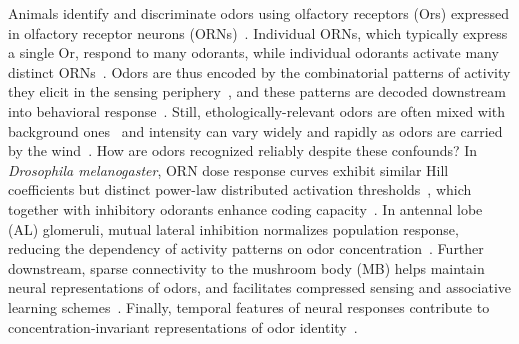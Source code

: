 \documentclass[9pt,lineno]{elife}
\begin{document}
Animals identify and discriminate odors using olfactory receptors (Ors) expressed in olfactory receptor neurons (ORNs)~\citep{chemoreceptors_review,buck1991novel,or_discovery_carlson,or_discovery_vosshall}. Individual ORNs, which typically express a single Or, respond to many odorants, while individual odorants activate many distinct ORNs~\citep{friedrich1997combinatorial,hallem_carlson,mosquito_combinatorial_coding,nara2011large}. Odors are  thus encoded by the combinatorial patterns of activity they elicit in the sensing periphery~\citep{malnic1999combinatorial, mosquito_combinatorial_coding, hildebrand1997mechanisms, hallem_carlson, debryune_odor_coding, friedrich1997combinatorial}, and these patterns are decoded downstream into behavioral response~\citep{early_olfactory_processing, louis_chemotaxis}.  Still, ethologically-relevant odors are often mixed with background ones~\citep{coding_background, odor_backgrounds} and intensity can vary widely and rapidly as odors are carried by the wind~\citep{murlis_odor_plumes, fluid_dynamics_chemosensory, celani, carde_navigation}. How are odors recognized reliably despite these confounds? %
In \textit{Drosophila melanogaster}, ORN dose response curves exhibit similar Hill coefficients but distinct power-law distributed activation thresholds~\citep{hallem_carlson, si2017invariances}, which together with inhibitory odorants enhance coding capacity~\citep{si2017invariances, Cao_Tu_WL, hallem_carlson, stevens}. In antennal lobe (AL) glomeruli, mutual lateral inhibition normalizes population response, reducing the dependency of activity patterns on odor concentration~\citep{lateral_inh_asahina, divisive_normalization}. Further downstream, sparse connectivity to the mushroom body (MB) helps maintain neural representations of odors, and facilitates compressed sensing and associative learning schemes~\citep{abbott_axel, litwinkumar, vijay_1, stevens_2}. Finally, temporal features of neural responses contribute to concentration-invariant representations of odor identity~\citep{stopfer_nat_neuro, stopfer_temporal_model, stopfer_temporal_channel, primacy_coding}.
\end{document}
